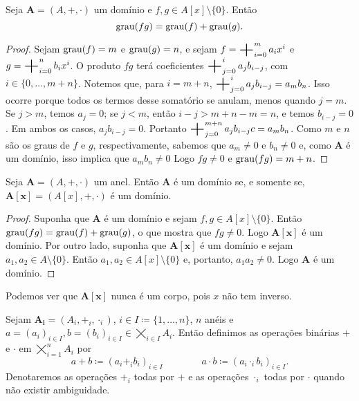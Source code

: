 \begin{prop}
	Seja $\bm A=(A,+,\cdot)$ um domínio e $f,g \in A[x]\setminus\{0\}$. Então
	\begin{equation*}
	\operatorname{grau}(fg)=\operatorname{grau}(f)+\operatorname{grau}(g).
	\end{equation*}
\end{prop}
\begin{proof}
	Sejam $\operatorname{grau}(f)=m$ e $\operatorname{grau}(g)=n$, e sejam $f = \bigsum_{i=0}^m a_ix^i$ e $g = \bigsum_{i=0}^n b_ix^i$. O produto $fg$ terá coeficientes $\bigsum_{j=0}^i a_jb_{i-j}$, com $i \in \{0,\ldots,m+n\}$. Notemos que, para $i = m+n$, $\bigsum_{j=0}^i a_jb_{i-j} = a_mb_n$. Isso ocorre porque todos os termos desse somatório se anulam, menos quando $j=m$. Se $j>m$, temos $a_j=0$; se $j<m$, então $i-j > m+n-m = n$, e temos $b_{i-j}=0$. Em ambos os casos, $a_jb_{i-j}=0$. Portanto $\bigsum_{j=0}^{m+n} a_jb_{i-j}c= a_mb_n$. Como $m$ e $n$ são os graus de $f$ e $g$, respectivamente, sabemos que $a_m \neq 0$ e $b_n \neq 0$ e, como $\bm A$ é um domínio, isso implica que $a_mb_n \neq 0$ Logo $fg \neq 0$ e $\operatorname{grau}(fg)=m+n$.
\end{proof}

\begin{prop}
	Seja $\bm A=(A,+,\cdot)$ um anel. Então $\bm A$ é um domínio se, e somente se, $\bm{A[x]}=(A[x],+,\cdot)$ é um domínio.
\end{prop}
\begin{proof}
	Suponha que $\bm A$ é um domínio e sejam $f,g \in A[x]\setminus\{0\}$. Então $\operatorname{grau}(fg)=\operatorname{grau}(f)+\operatorname{grau}(g)$, o que mostra que $fg \neq 0$. Logo $\bm{A[x]}$ é um domínio. Por outro lado, suponha que $\bm{A[x]}$ é um domínio e sejam $a_1,a_2 \in A\setminus\{0\}$. Então $a_1,a_2 \in A[x]\setminus\{0\}$ e, portanto, $a_1a_2 \neq 0$. Logo $\bm A$ é um domínio.
\end{proof}

Podemos ver que $\bm{A[x]}$ nunca é um corpo, pois $x$ não tem inverso.

\begin{defi}
	Sejam $\bm{A_i}=(A_i,+_i,\cdot_i)$, $i \in I \coloneqq \{1,\ldots,n\}$, $n$ anéis e $a=(a_i)_{i \in I}, b=(b_i)_{i \in I} \in \bigtimes_{i \in I} A_i$. Então definimos as operações binárias $+$ e $\cdot$ em $\bigtimes_{i=1}^n A_i$ por
	\begin{equation*}
	a + b \coloneqq (a_i +_i b_i)_{i \in I} \qquad \qquad a \cdot b \coloneqq (a_i \cdot_i b_i)_{i \in I}.
	\end{equation*}
Denotaremos as operações $+_i$ todas por $+$ e as operações $\cdot_i$ todas por $\cdot$ quando não existir ambiguidade.
\end{defi}

